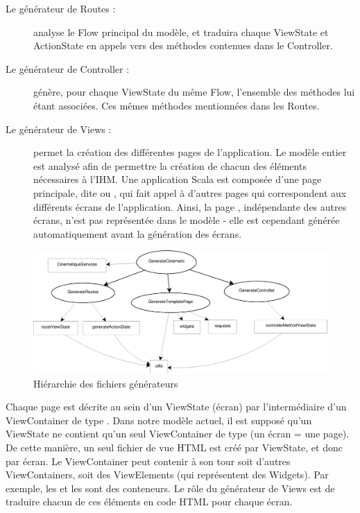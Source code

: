 \begin{description}

\item[Le générateur de Routes :] analyse le Flow principal du modèle, et traduira chaque ViewState et ActionState en appels vers des méthodes contenues dans le Controller.

\item[Le générateur de Controller :] génère, pour chaque ViewState du même Flow, l'ensemble des méthodes lui étant associées. Ces mêmes méthodes mentionnées dans les Routes.

\item[Le générateur de Views :] permet la création des différentes pages de l'application. Le modèle entier est analysé afin de permettre la création de chacun des éléments nécessaires à l'\textsc{IHM}. Une application Scala est composée d'une page principale, dite  ou , qui fait appel à d'autres pages qui correspondent aux différents écrans de l'application. Ainsi, la page , indépendante des autres écrans, n'est pas représentée dans le modèle - elle est cependant générée automatiquement avant la génération des écrans.

\end{description}

\begin{figure}[h]
  \centering
  \includegraphics[scale=.35]{img/hierarchie.eps}
  \caption{Hiérarchie des fichiers générateurs}
  \label{fig:gen}
\end{figure}


Chaque page est décrite au sein d'un ViewState (écran) par l'intermédiaire d'un ViewContainer de type . Dans notre modèle actuel, il est supposé qu'un ViewState ne contient qu'un seul ViewContainer de type  (un écran = une page). De cette manière, un seul fichier de vue HTML est créé par ViewState, et donc par écran. Le ViewContainer  peut contenir à son tour soit d'autres ViewContainers, soit des ViewElements (qui représentent des Widgets). Par exemple, les  et les  sont des conteneurs. Le rôle du générateur de Views est de traduire chacun de ces éléments en code HTML pour chaque écran.

